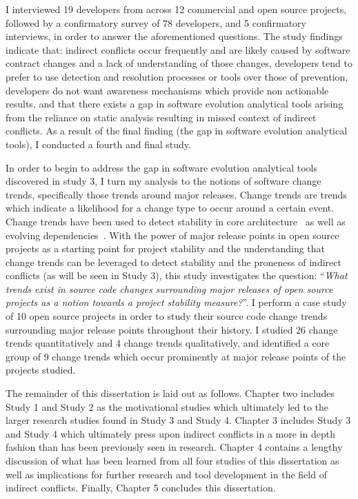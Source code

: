 I interviewed 19 developers from across 12 commercial and open source projects, followed by a confirmatory survey of 78 
developers, and 5 confirmatory interviews, in order to answer the aforementioned questions. The study findings indicate that: 
indirect conflicts occur frequently and are likely caused by software contract changes and a lack of understanding of those changes,
developers tend to prefer to use detection and resolution processes or tools
over those of prevention, developers do not want awareness mechanisms which provide non actionable results, 
and that there exists a gap in software evolution analytical tools arising from the reliance on static analysis resulting in missed
context of indirect conflicts. As a result of the final finding (the gap in software evolution analytical tools), I conducted
a fourth and final study.

In order to begin to address the gap in software evolution analytical tools discovered in study 3, I turn my analysis to the notions 
of software change trends, specifically those trends around major releases. Change trends are trends which indicate
a likelihood for a change type to occur around a certain event. Change trends have been used to detect
stability in core architecture~\cite{Wermelinger:2008:AEE} as well as evolving dependencies~\cite{Businge:2010:ESE}.
With the power of major release points in open source projects as a starting point for project stability and the understanding that change trends can
be leveraged to detect stability and the proneness of indirect conflicts (as will be seen in Study 3), this study investigates the question:
``\textit{What trends exist in source code changes surrounding major releases of open source projects as a notion towards a project
stability measure?}''. I perform a case study of 10 open source projects in order to study their source code change trends surrounding major release points
throughout their history. I studied 26 change trends quantitatively and 4 change trends qualitatively, and identified a core group of 9 change trends which occur
prominently at major release points of the projects studied.

The remainder of this dissertation is laid out as follows. Chapter two includes Study 1 and Study 2 as the motivational studies which
ultimately led to the larger research studies found in Study 3 and Study 4. Chapter 3 includes Study 3 and Study 4 which ultimately
press upon indirect conflicts in a more in depth fashion than has been previously seen in research. Chapter 4 contains a lengthy discussion
of what has been learned from all four studies of this dissertation as well as implications for further research and tool development
in the field of indirect conflicts. Finally, Chapter 5 concludes this dissertation.